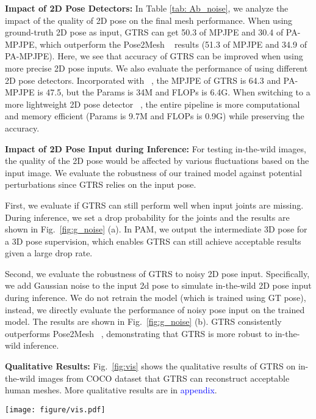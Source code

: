 \documentclass[sigconf]{acmart}
\begin{document}
\textbf{Impact of 2D Pose Detectors:}
In Table \ref{tab: Ab_noise}, we analyze the impact of the quality of 2D pose on the final mesh performance. 
When using ground-truth 2D pose as input, GTRS can get 50.3 of MPJPE and 30.4 of PA-MPJPE, which outperform the Pose2Mesh ~\cite{Choi_2020_ECCV_Pose2Mesh} results (51.3 of MPJPE and 34.9 of PA-MPJPE). Here, we see that accuracy of GTRS can be improved when using more precise 2D pose inputs.
We also evaluate the performance of using different 2D pose detectors. Incorporated with ~\cite{get2dpose}, the MPJPE of GTRS is 64.3 and PA-MPJPE is 47.5, but the Params is 34M and FLOPs is 6.4G. When switching to a more lightweight 2D pose detector  ~\cite{LiteHRNet}, the entire pipeline is more computational and memory efficient (Params is 9.7M and FLOPs is 0.9G) while preserving the accuracy.



\textbf{Impact of 2D Pose Input during Inference:}
For testing in-the-wild images, the quality of the 2D pose would be affected by various fluctuations based on the input image. We evaluate the robustness of our trained model against potential perturbations since GTRS relies on the input pose. 

First, we evaluate if GTRS can still perform well when input joints are missing. During inference, we set a drop probability for the joints and the results are shown in Fig.~\ref{fig:g_noise} (a). In PAM, we output the intermediate 3D pose for a 3D pose supervision, which enables GTRS can still achieve acceptable results given a large drop rate.  


Second, we evaluate the robustness of GTRS to noisy 2D pose input. Specifically, we add Gaussian noise  to the input 2d pose to simulate in-the-wild 2D pose input during inference. We do not retrain the model (which is trained using GT pose), instead, we directly evaluate the performance of noisy pose input on the trained model. The results are shown in Fig.~\ref{fig:g_noise} (b). GTRS consistently outperforms Pose2Mesh ~\cite{Choi_2020_ECCV_Pose2Mesh}, demonstrating that GTRS is more robust to in-the-wild inference.  

\textbf{Qualitative Results:}
Fig.~\ref{fig:vis} shows the qualitative results of GTRS on in-the-wild images from COCO dataset that GTRS can reconstruct acceptable human meshes. More qualitative results are in \textcolor{blue}{appendix}.


\begin{figure*}[htp]
\vspace{-5pt}
  \centering
  \texttt{[image: figure/vis.pdf]}
  \vspace{-10pt}
  \caption{Qualitative results of the proposed GTRS. Images are taken from the in-the-wild COCO ~\cite{lin2014mscoco} dataset.}
  \label{fig:vis}
  \vspace{-5pt}
\end{figure*}
\end{document}
